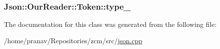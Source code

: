\subsubsection[{\texorpdfstring{type\+\_\+}{type_}}]{ Json\+::\+Our\+Reader\+::\+Token\+::type\+\_\+}\hypertarget{classJson_1_1OurReader_1_1Token_abe7d858530396fa7e1293f7a579880ed}{}\label{classJson_1_1OurReader_1_1Token_abe7d858530396fa7e1293f7a579880ed}


The documentation for this class was generated from the following file\+:\begin{DoxyCompactItemize}
\item 
/home/pranav/\+Repositories/zcm/src/\hyperlink{json_8cpp}{json.\+cpp}\end{DoxyCompactItemize}

